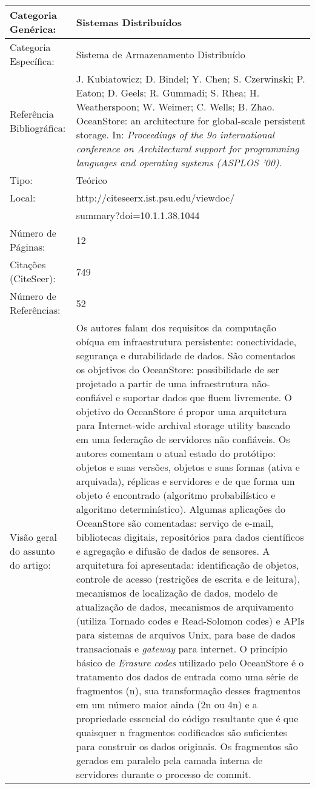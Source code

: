\documentclass[10pt,a4paper]{article}
\begin{document}
\begin{center}
\begin{tabular}{|p{5cm}||p{10cm}|}
\hline
Categoria Genérica: & Sistemas Distribuídos\\\hline
Categoria Específica: & Sistema de Armazenamento Distribuído\\\hline
Referência Bibliográfica: & J. Kubiatowicz; D. Bindel; Y. Chen; S. Czerwinski; P. Eaton; D. Geels; R. Gummadi; S. Rhea; H. Weatherspoon; W. Weimer; C. Wells; B. Zhao. OceanStore: an architecture for global-scale persistent storage. In: \emph{Proceedings of the 9o international conference on Architectural support for programming languages and operating systems (ASPLOS '00)}.\\\hline
Tipo: & Teórico\\\hline
Local: & http://citeseerx.ist.psu.edu/viewdoc/\\ & summary?doi=10.1.1.38.1044\\\hline
Número de Páginas: & 12\\\hline
Citações (CiteSeer): & 749\\\hline
Número de Referências: & 52\\\hline
Visão geral do assunto do artigo: & Os autores falam dos requisitos da computação obíqua em infraestrutura persistente: conectividade, segurança e durabilidade de dados. São comentados os objetivos do OceanStore: possibilidade de ser projetado a partir de uma infraestrutura não-confiável e suportar dados que fluem livremente. O objetivo do OceanStore é propor uma arquitetura para Internet-wide archival storage utility baseado em uma federação de servidores não confiáveis. Os autores comentam o atual estado do protótipo: objetos e suas versões, objetos e suas formas (ativa e arquivada), réplicas e servidores e de que forma um objeto é encontrado (algoritmo probabilístico e algoritmo determinístico). Algumas aplicações do OceanStore são comentadas: serviço de e-mail, bibliotecas digitais, repositórios para dados científicos e agregação e difusão de dados de sensores. A arquitetura foi apresentada: identificação de objetos, controle de acesso (restrições de escrita e de leitura), mecanismos de localização de dados, modelo de atualização de dados, mecanismos de arquivamento (utiliza Tornado codes e Read-Solomon codes) e APIs para sistemas de arquivos Unix, para base de dados transacionais e \emph{gateway} para internet. O princípio básico de \emph{Erasure codes} utilizado pelo OceanStore é o tratamento dos dados de entrada como uma série de fragmentos (n), sua transformação desses fragmentos em um número maior ainda (2n ou 4n) e a propriedade essencial do código resultante que é que quaisquer n fragmentos codificados são suficientes para construir os dados originais. Os fragmentos são gerados em paralelo pela camada interna de servidores durante o processo de commit. \\\hline

\end{tabular}
\end{center}
\end{document}
